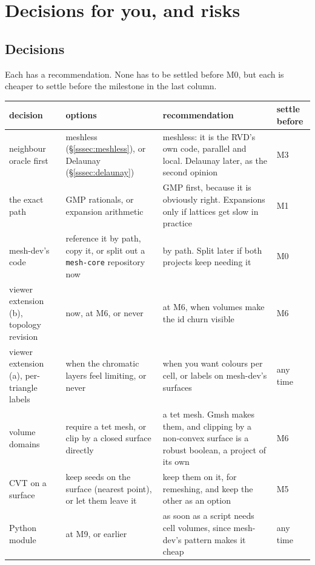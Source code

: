 \documentclass[11pt,a4paper]{article}
\newcommand{\code}[1]{\texttt{#1}}          %
\newcommand{\secref}[1]{\S\ref{#1}}
\begin{document}
\section{Decisions for you, and risks}\label{sec:decisions}

\subsection{Decisions}\label{ssec:decisionlist}

Each has a recommendation. None has to be settled before M0, but each is cheaper to settle before
the milestone in the last column.

{\small
\begin{xltabular}{\linewidth}{@{}P{2.6cm} L L P{1.3cm}@{}}
\toprule
decision & options & recommendation & settle before \\
\midrule
\endhead
neighbour oracle first & meshless (\secref{sssec:meshless}), or Delaunay
  (\secref{sssec:delaunay})
  & meshless: it is the RVD's own code, parallel and local. Delaunay later, as the second
    opinion & M3 \\
the exact path & GMP rationals, or expansion arithmetic
  & GMP first, because it is obviously right. Expansions only if lattices get slow in practice
  & M1 \\
mesh-dev's code & reference it by path, copy it, or split out a \code{mesh-core} repository now
  & by path. Split later if both projects keep needing it & M0 \\
viewer extension (b), topology revision & now, at M6, or never
  & at M6, when volumes make the id churn visible & M6 \\
viewer extension (a), per-triangle labels & when the chromatic layers feel limiting, or never
  & when you want colours per cell, or labels on mesh-dev's surfaces & any time \\
volume domains & require a tet mesh, or clip by a closed surface directly
  & a tet mesh. Gmsh makes them, and clipping by a non-convex surface is a robust boolean, a
    project of its own & M6 \\
CVT on a surface & keep seeds on the surface (nearest point), or let them leave it
  & keep them on it, for remeshing, and keep the other as an option & M5 \\
Python module & at M9, or earlier
  & as soon as a script needs cell volumes, since mesh-dev's pattern makes it cheap & any time \\
\bottomrule
\end{xltabular}}
\end{document}
